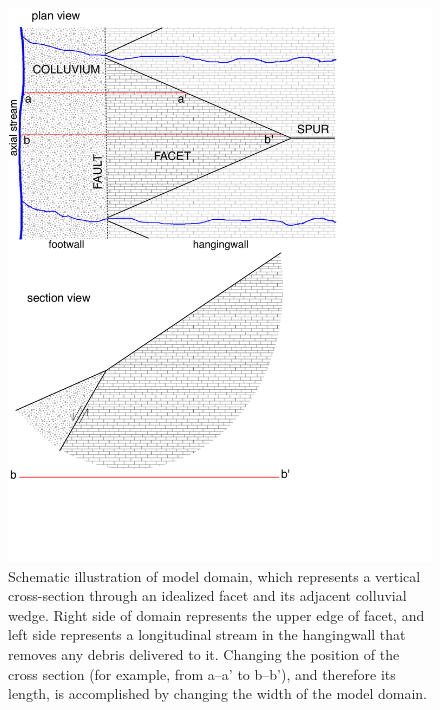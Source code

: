 \begin{figure}[ht!]
\centerline{\includegraphics[scale=0.6]{figure5}}
\caption{Schematic illustration of model domain, which represents a vertical cross-section through an idealized facet and its adjacent colluvial wedge. Right side of domain represents the upper edge of facet, and left side represents a longitudinal stream in the hangingwall that removes any debris delivered to it. Changing the position of the cross section (for example, from a--a' to b--b'), and therefore its length, is accomplished by changing the width of the model domain.}
\label{fig:domainschematic}
\end{figure}

